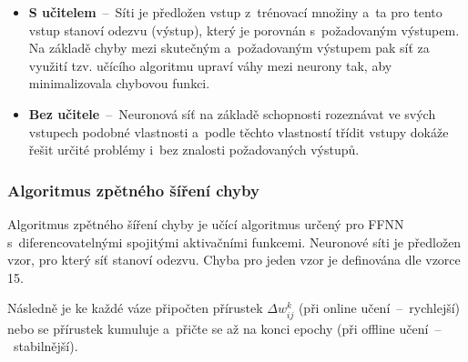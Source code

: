 \documentclass[a4paper,12pt]{article}
\begin{document}
{{{{{{{{\begin{itemize}
\item \textbf{S učitelem}~--~Síti je předložen vstup z~trénovací množiny a~ta pro tento vstup stanoví odezvu (výstup), který je porovnán s~požadovaným výstupem. Na základě chyby mezi skutečným a~požadovaným výstupem pak síť za využití tzv. učícího algoritmu upraví váhy mezi neurony tak, aby minimalizovala chybovou funkci.

\item \textbf{Bez učitele}~--~Neuronová síť na základě schopnosti rozeznávat ve svých vstupech podobné vlastnosti a~podle těchto vlastností třídit vstupy dokáže řešit určité problémy i~bez znalosti požadovaných výstupů.~\cite{nn}
\end{itemize}

\subsubsection{Algoritmus zpětného šíření chyby}

Algoritmus zpětného šíření chyby je učící algoritmus určený pro FFNN s~diferencovatelnými spojitými aktivačními funkcemi. Neuronové síti je předložen vzor, pro který síť stanoví odezvu. Chyba pro jeden vzor je definována dle vzorce 15.~\cite{nn}


Následně je ke každé váze připočten přírustek $\Delta w_{ij}^k$ (při online učení~--~rychlejší) nebo se přírustek kumuluje a~přičte se až na konci epochy (při offline učení~--~stabilnější).~\cite{nn}


}}}}}}}}
\end{document}
